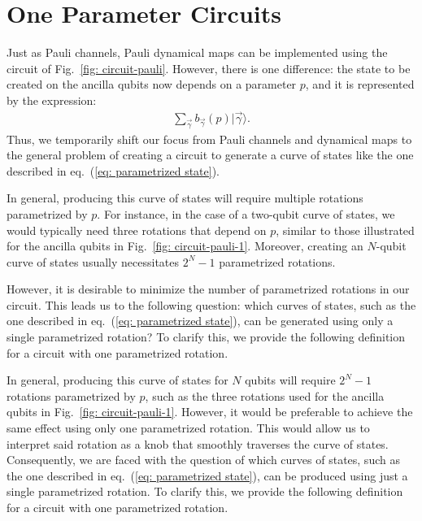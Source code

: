 \documentclass[10pt,letterpaper]{article} %
\newcommand{\fref}[1]{Fig.~\ref{#1}}
\newcommand{\eref}[1]{eq.~(\ref{#1})}
\begin{document}
\section{One Parameter Circuits} %
\label{sec: 1PR Circuits}
 


Just as Pauli channels, Pauli dynamical maps can be implemented using the circuit
of \fref{fig: circuit-pauli}. However, there is one difference: 
the state to be created on the ancilla qubits now 
depends on a parameter $p$, and it is represented by the expression:
\begin{eqnarray}
\label{eq: parametrized state}
\sum_{\vec{\gamma}} b_{\vec{\gamma}}(p) |\vec{\gamma}\rangle.
\end{eqnarray}
Thus, we temporarily shift our focus from Pauli
channels and dynamical maps to the general problem of 
creating a circuit to generate a curve of
states like the one described in \eref{eq: parametrized state}.
 

In general, producing this curve of states will require multiple rotations
parametrized by $p$. For instance, in the case of a two-qubit curve of states,
we would typically need three rotations that depend on $p$, similar to those
illustrated for the ancilla qubits in \fref{fig: circuit-pauli-1}.
Moreover, creating an $N$-qubit curve of states
usually necessitates $2^N-1$ parametrized rotations.
 

However, it is desirable to minimize the number of parametrized rotations in our circuit.
This leads us to the following question: which curves of states,
such as the one described in \eref{eq: parametrized state}, 
can be generated using only a single parametrized rotation? 
To clarify this, we provide the following definition for a circuit with one parametrized rotation.

{\color{orange} In general, producing this curve of states for $N$ qubits will require
$2^N-1$ rotations parametrized by $p$,
such as the three rotations used for the ancilla
qubits in \fref{fig: circuit-pauli-1}.
However, it would be preferable to achieve the same effect using only one parametrized rotation. 
This would allow us to interpret said rotation 
as a knob that smoothly traverses the curve of states.
Consequently, we are faced with the question of which curves of states, 
such as the one described in \eref{eq: parametrized state}, 
can be produced using just a single parametrized rotation. 
To clarify this, we provide the following definition 
for a circuit with one parametrized rotation.}
\end{document}
